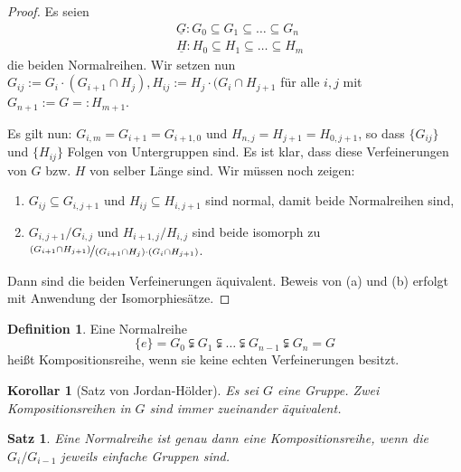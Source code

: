 \documentclass[12pt]{scrartcl}%
\newtheorem{thm}{Satz}
\newtheorem{kor}{Korollar}
\theoremstyle{definition}
\newtheorem*{defn}{Definition}
\theoremstyle{remark}
\begin{document}
\begin{proof}
    Es seien 
    \[\begin{split}
            &\underline{G}: G_0\subseteq G_1 \subseteq\dots\subseteq G_n \\
            &\underline{H}: H_0\subseteq H_1\subseteq\dots\subseteq H_m 
        \end{split}\]
    die beiden Normalreihen. Wir setzen nun $G_{ij}:=G_i\cdot(G_{i+1}\cap H_j), H_{ij} := H_j\cdot(G_i\cap H_{j+1}$ für alle $i,j$ mit $G_{n+1}:=G=:H_{m+1}$.
    
    Es gilt nun: $G_{i,m}=G_{i+1}=G_{i+1,0}$ und $H_{n,j}=H_{j+1}=H_{0,j+1}$, so dass $\{G_{ij}\}$ und $\{H_{ij}\}$ Folgen von Untergruppen sind. Es ist klar, dass diese Verfeinerungen von $G$ bzw. $H$ von selber Länge sind. Wir müssen noch zeigen:
    \begin{enumerate}[label=(\alph*)]
        \item $G_{ij}\subseteq G_{i,j+1}$ und $H_{ij}\subseteq H_{i,j+1}$ sind normal, damit beide Normalreihen sind,
        \item $G_{i,j+1}/G_{i,j}$ und $H_{i+1,j}/H_{i,j}$ sind beide isomorph zu $\nicefrac{(G_{i+1}\cap H_{j+1})}{(G_{i+1}\cap H_{j})\cdot(G_{i}\cap H_{j+1})}$.
    \end{enumerate}
    Dann sind die beiden Verfeinerungen äquivalent. Beweis von (a) und (b) erfolgt mit Anwendung der Isomorphiesätze.
\end{proof}

\begin{defn}
    Eine Normalreihe 
        \[\{e\}=G_0\subsetneqq G_1 \subsetneqq\dots\subsetneqq G_{n-1}\subsetneqq G_n=G \]
    heißt Kompositionsreihe, wenn sie keine echten Verfeinerungen besitzt.
\end{defn}

\begin{kor}[Satz von Jordan-Hölder]
    Es sei $G$ eine Gruppe. Zwei Kompositionsreihen in $G$ sind immer zueinander äquivalent.
\end{kor}

\begin{thm}
    Eine Normalreihe ist genau dann eine Kompositionsreihe, wenn die $G_i/G_{i-1}$ jeweils einfache Gruppen sind.
\end{thm}
\end{document}
